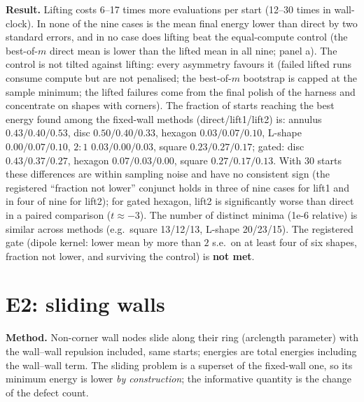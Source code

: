 \documentclass[11pt,a4paper]{article}
\begin{document}
\textbf{Result.} Lifting costs 6--17 times more evaluations per start (12--30 times in wall-clock). In none of the nine cases is the mean
final energy lower than direct by two standard errors, and in no case does lifting beat the equal-compute control (the best-of-$m$
direct mean is lower than the lifted mean in all nine; panel a). The control is not tilted against lifting: every asymmetry favours
it (failed lifted runs consume compute but are not penalised; the best-of-$m$ bootstrap is capped at the sample minimum; the lifted
failures come from the final polish of the harness and concentrate on shapes with corners). The fraction of starts reaching the best
energy found among the fixed-wall methods (direct/lift1/lift2) is: annulus $0.43/0.40/0.53$, disc $0.50/0.40/0.33$, hexagon
$0.03/0.07/0.10$, L-shape $0.00/0.07/0.10$, $2{:}1$ $0.03/0.00/0.03$, square $0.23/0.27/0.17$; gated: disc $0.43/0.37/0.27$, hexagon
$0.07/0.03/0.00$, square $0.27/0.17/0.13$. With 30 starts these differences are within sampling noise and have no consistent sign (the
registered ``fraction not lower'' conjunct holds in three of nine cases for lift1 and in four of nine for lift2); for gated hexagon, lift2 is
significantly worse than direct in a paired comparison ($t\approx-3$). The number of distinct minima (1e-6 relative) is similar across methods
(e.g.\ square 13/12/13, L-shape 20/23/15). The registered gate (dipole kernel: lower mean by more than $2$ s.e.\ on at least four of six
shapes, fraction not lower, and surviving the control) is \textbf{not met}.

\section{E2: sliding walls}

\textbf{Method.} Non-corner wall nodes slide along their ring (arclength parameter) with the wall--wall repulsion included, same starts;
energies are total energies including the wall--wall term. The sliding problem is a superset of the fixed-wall one, so its minimum
energy is lower \emph{by construction}; the informative quantity is the change of the defect count.
\end{document}
